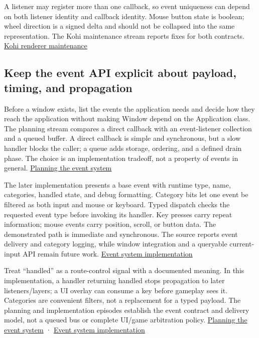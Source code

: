 \hypertarget{05-engine-i-ch013-make-event-identity-and-input-values-explicit}{}

A listener may register more than one callback, so event uniqueness can depend on both listener identity and callback identity. Mouse button state is boolean; wheel direction is a signed delta and should not be collapsed into the same representation. The Kohi maintenance stream reports fixes for both contracts. \href{https://www.youtube.com/watch?v=x8ao57nbMlY}{Kohi renderer maintenance}

\subsection{Keep the event API explicit about payload, timing, and propagation}\label{05-engine-i-ch013-keep-the-event-api-explicit-about-payload-timing-and-propagation}

\hypertarget{05-engine-i-ch013-keep-the-event-api-explicit-about-payload-timing-and-propagation}{}

Before a window exists, list the events the application needs and decide how they reach the application without making Window depend on the Application class. The planning stream compares a direct callback with an event-listener collection and a queued buffer. A direct callback is simple and synchronous, but a slow handler blocks the caller; a queue adds storage, ordering, and a defined drain phase. The choice is an implementation tradeoff, not a property of events in general. \href{https://www.youtube.com/watch?v=5mlziHwq90k}{Planning the event system}

The later implementation presents a base event with runtime type, name, categories, handled state, and debug formatting. Category bits let one event be filtered as both input and mouse or keyboard. Typed dispatch checks the requested event type before invoking its handler. Key presses carry repeat information; mouse events carry position, scroll, or button data. The demonstrated path is immediate and synchronous. The source reports event delivery and category logging, while window integration and a queryable current-input API remain future work. \href{https://www.youtube.com/watch?v=xnopUoZbMEk}{Event system implementation}

Treat ``handled'' as a route-control signal with a documented meaning. In this implementation, a handler returning handled stops propagation to later listeners/layers; a UI overlay can consume a key before gameplay sees it. Categories are convenient filters, not a replacement for a typed payload. The planning and implementation episodes establish the event contract and delivery model, not a queued bus or complete UI/game arbitration policy. \href{https://www.youtube.com/watch?v=5mlziHwq90k}{Planning the event system} · \href{https://www.youtube.com/watch?v=xnopUoZbMEk}{Event system implementation}

